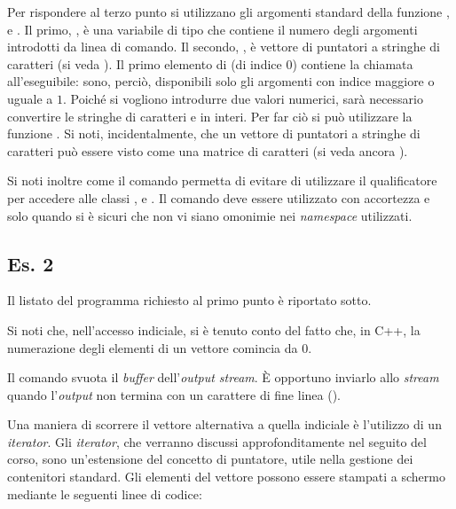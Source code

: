 Per rispondere al terzo punto si utilizzano gli argomenti standard
della funzione ,  e . Il primo,
, \`e una variabile di tipo  che contiene il numero
degli argomenti introdotti da linea di comando. Il secondo,
, \`e vettore di puntatori a stringhe di caratteri (si veda
). Il primo elemento di  (di indice $0$)
contiene la chiamata all'eseguibile: sono, perci\`o, disponibili solo
gli argomenti con indice maggiore o uguale a $1$. Poich\'e si vogliono
introdurre due valori numerici, sar\`a necessario convertire le
stringhe di caratteri  e  in interi. Per far
ci\`o si pu\`o utilizzare la funzione . Si noti,
incidentalmente, che un vettore di puntatori a stringhe di caratteri
pu\`o essere visto come una matrice di caratteri (si veda ancora
).
%
\lstset{basicstyle=\scriptsize\sf}

\lstset{basicstyle=\sf}
%
Si noti inoltre come il comando 
permetta di evitare di utilizzare il qualificatore  per
accedere alle classi ,  e . Il comando
 deve essere utilizzato con accortezza e solo
quando si \`e sicuri che non vi siano omonimie nei \emph{namespace}
utilizzati.

\subsection*{Es. 2}
Il listato del programma richiesto al primo punto \`e riportato sotto.
%
\lstset{basicstyle=\scriptsize\sf}

\lstset{basicstyle=\sf}

Si noti che, nell'accesso indiciale, si \`e tenuto conto del fatto
che, in C++, la numerazione degli elementi di un vettore comincia da
$0$.

Il comando  svuota il \emph{buffer} dell'\emph{output
  stream}. \`E opportuno inviarlo allo \emph{stream} quando
l'\emph{output} non termina con un carattere di fine linea
().

Una maniera di scorrere il vettore alternativa a quella indiciale \`e
l'utilizzo di un \emph{iterator}. Gli \emph{iterator}, che verranno
discussi approfonditamente nel seguito del corso, sono un'estensione
del concetto di puntatore, utile nella gestione dei contenitori
standard. Gli elementi del vettore  possono essere stampati
a schermo mediante le seguenti linee di codice:
\lstset{basicstyle=\scriptsize\sf}

\lstset{basicstyle=\sf}

